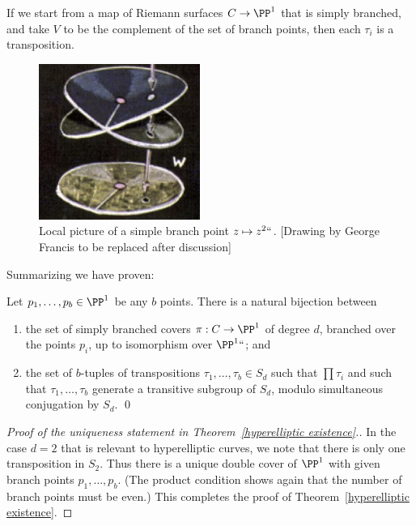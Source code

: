 If we start from a map of Riemann surfaces $C\to \PP^{1}$ that is
 simply branched, and take $V$ to be the complement of the set of
 branch points,
 then each $\tau_i$ is a transposition.

\begin{figure}
\inprogress
\centerline {\includegraphics[height=2in]{"main/Fig05-2"}}
 \caption{Local picture of a simple branch point $z \mapsto z^2` `$.
   [Drawing by George Francis to be replaced after discussion]
%
%
}
\label{square root function graph}
\end{figure}

Summarizing we have proven:
   \begin{lemma}
   \label{branched cover classification}
   Let $p_1,\dots, p_b \in \PP^1$ be any $b$
points. There is a
   natural bijection between
   \begin{enumerate}
   \item the set of  simply branched covers $\pi : C \to \PP^1$ of
   degree $d$, branched over the points $p_i$, up to isomorphism over
   $\PP^1` `$; and
   \item the set of $b$-tuples of transpositions $\tau_1, \dots, \tau_b
   \in S_d$ such that $\prod \tau_i$
and such that $\tau_1, \dots,
   \tau_b$ generate a transitive subgroup of $S_d$, modulo simultaneous
   conjugation by $S_d$.
   \qed
   \end{enumerate}
\let\qed\relax
   \end{lemma}

\begin{proof}[Proof of the uniqueness statement  in
Theorem~\ref{hyperelliptic existence}.]
In the case $d=2$ that is relevant to hyperelliptic curves, we note that
there is only one transposition in $S_2$. Thus there is a unique double
cover of $\PP^1$ with given branch points $p_1,\dots,p_b$. (The product
condition shows again that the number of branch points must be even.) This
completes the proof of Theorem~\ref{hyperelliptic existence}.
\end{proof}

